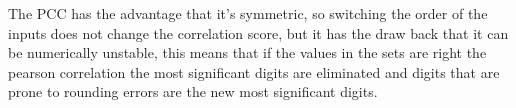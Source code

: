 The PCC has the advantage that it's symmetric, so switching the order of the inputs does not change the correlation score, but it has the draw back that it can be numerically unstable, this means that if the values in the sets are right the pearson correlation the most significant digits are eliminated and digits that are prone to rounding errors are the new most significant digits. 
